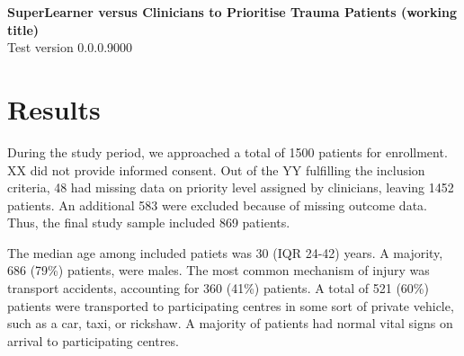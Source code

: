 \documentclass[10pt,letterpaper]{article}\usepackage[]{graphicx}\usepackage[]{color}
\begin{document}
{\Large
  \noindent\textbf{SuperLearner versus Clinicians to Prioritise Trauma Patients (working title)}
} \newline
\\
{\large
  Test version 0.0.0.9000
}
\section*{Results}
During the study period, we approached a total of 1500 patients
for enrollment. XX did not provide informed consent. Out of the YY fulfilling
the inclusion criteria, 48 had missing data on priority level
assigned by clinicians, leaving 1452
patients. An additional 583 were excluded because of missing outcome
data. Thus, the final study sample included
869 patients.

The median age among included patiets was 30 (IQR 24-42) years. A
majority, 686 (79\%) patients, were males. The most common
mechanism of injury was transport accidents, accounting for
360 (41\%) patients. A total of
521 (60\%) patients were transported to
participating centres in some sort of private vehicle, such as a car, taxi, or
rickshaw. A majority of patients had normal vital signs on arrival to
participating centres.
\end{document}
